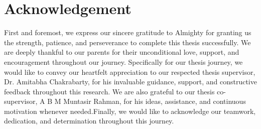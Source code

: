 \section*{Acknowledgement}
First and foremost, we express our sincere gratitude to Almighty for granting us the strength, patience, and perseverance to complete this thesis successfully. We are deeply thankful to our parents for their unconditional love, support, and encouragement throughout our journey. Specifically for our thesis journey, we would like to convey our heartfelt appreciation to our respected thesis supervisor, Dr. Amitabha Chakrabarty, for his invaluable guidance, support, and constructive feedback throughout this research. We are also grateful to our thesis co-supervisor, A B M Muntasir Rahman, for his ideas, assistance, and continuous motivation whenever needed.Finally, we would like to acknowledge our teamwork, dedication, and determination throughout this journey.